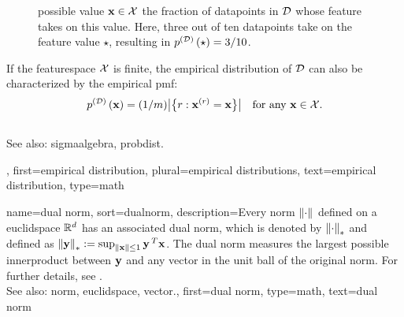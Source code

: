 {{\begin{figure}[H]
{			possible value ${\bf x} \in \mathcal{X}$ the fraction of \glspl{datapoint} 
			in $\mathcal{D}$ whose \gls{feature} takes on this value. Here, three out of 
        			ten \glspl{datapoint} take on the \gls{feature} value $\star$, resulting 
			in $p^{(\mathcal{D})}\left(\star\right) = 3/10$. \label{fig_empirical_pmf_dict}}
		\end{figure}
		If the \gls{featurespace} $\mathcal{X}$ is finite, 
		the empirical distribution of $\mathcal{D}$ can also be characterized by 
		the empirical \gls{pmf}:
		$$p^{(\mathcal{D})}\left({\bf x}\right) = 
		(1/m) \big| \big\{ r: {\bf x}^{(r)} = {\bf x} \big\} \big| 
		\quad \text{for any } {\bf x} \in \mathcal{X}.$$
		\\
        		See also: \gls{sigmaalgebra}, \gls{probdist}.},
     	first={empirical distribution},
     	plural={empirical distributions},
    	text={empirical distribution},
	type=math
}

{name={dual norm},
sort={dualnorm},
	description={Every \gls{norm} $\normgeneric{\cdot}{}$ defined on a \gls{euclidspace} $\mathbb{R}^{d}$ 
		has an associated dual \gls{norm}, which is denoted by $\normgeneric{\cdot}{*}$ and defined as 
		$\normgeneric{\vy}{*} \defeq \sup_{\norm{\vx}{} \le 1} \vy\,^{T} \vx$. 
		The dual \gls{norm} measures the largest possible \gls{innerproduct} between ${\bf y}$ 
		and any \gls{vector} in the unit ball of the original \gls{norm}. For further details, see 
		\cite[Sec.~A.1.6]{BoydConvexBook}.
					\\ 
		See also: \gls{norm}, \gls{euclidspace}, \gls{vector}.},
	first={dual norm},
	type=math,
	text={dual norm}
}

